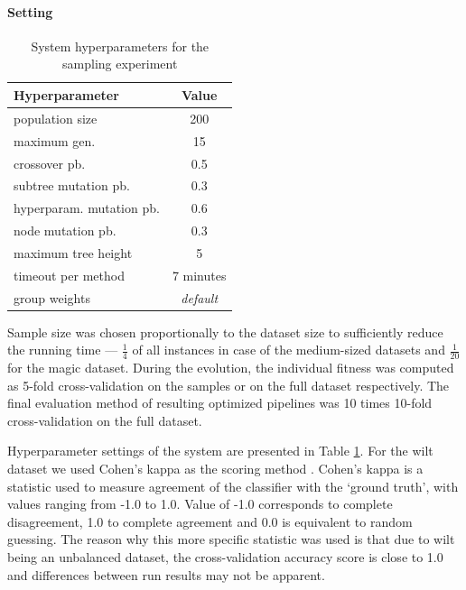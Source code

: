 \paragraph{Setting}

\begin{table}[ht]

\centering
\caption{System hyperparameters for the sampling experiment}\label{tab04:exp1:setting}
\begin{tabular}{l c}
\toprule
\textbf{\upshape Hyperparameter} & \textbf{Value} \\
\midrule
population size & 200 \\
maximum gen. & 15 \\
crossover pb. & 0.5 \\
subtree mutation pb. & 0.3 \\
hyperparam. mutation pb. & 0.6 \\
node mutation pb. & 0.3 \\
maximum tree height & 5 \\
timeout per method  & 7 minutes \\
group weights & \textit{default} \\
\bottomrule

\end{tabular}

\end{table}

Sample size was chosen proportionally to the dataset size to sufficiently
reduce the running time --- $\frac{1}{4}$ of all instances in case of the
medium-sized datasets and $\frac{1}{20}$ for the magic dataset. During the
evolution, the individual fitness was computed as 5-fold cross-validation on
the samples or on the full dataset respectively. The final evaluation method of
resulting optimized pipelines was 10 times 10-fold cross-validation on
the full dataset.

Hyperparameter settings of the system are presented in Table
\ref{tab04:exp1:setting}. For the wilt dataset we used Cohen's kappa
as the scoring method \citep{doi:10.1177/001316446002000104}. Cohen's kappa is a statistic used to measure agreement
of the classifier with the `ground truth', with values ranging from -1.0 to 1.0.
Value of -1.0 corresponds to complete disagreement, 1.0 to complete agreement
and 0.0 is equivalent to random guessing. The reason why this more specific
statistic was used is that due to wilt being an unbalanced dataset, the
cross-validation accuracy score is close to 1.0 and differences between
run results may not be apparent.

